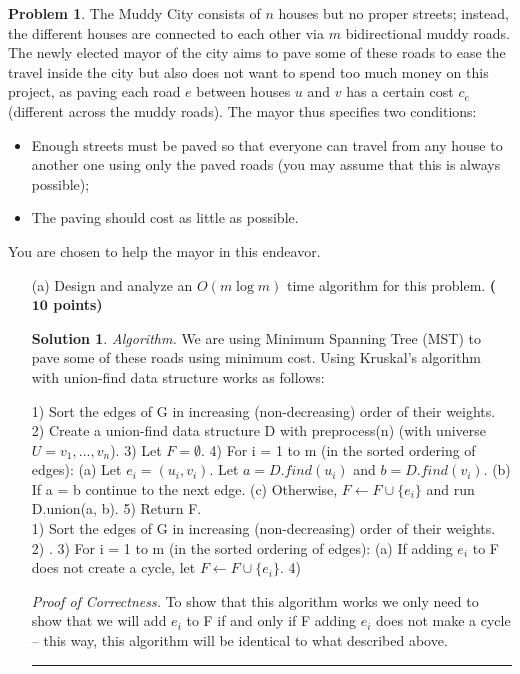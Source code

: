 \documentclass{article}
\theoremstyle{definition}
\newtheorem{problem}{Problem}
\def\fline{\rule{0.75\linewidth}{0.5pt}}
\newcommand{\finishline}{\begin{center}\fline\end{center}}
\newtheorem*{solution*}{Solution}
\newenvironment{solution}{\begin{solution*}}{{\finishline} \end{solution*}}
\newcommand{\grade}[1]{\hfill{\textbf{($\mathbf{#1}$ points)}}}
\begin{document}
\begin{problem}
	The Muddy City consists of $n$ houses but no proper streets; instead, the different houses are connected to each other via $m$ bidirectional muddy roads. The newly elected mayor of the city aims to pave some of these roads to ease
	the travel inside the city but also does not want to spend too much money on this project, as paving each road $e$ between houses $u$ and $v$ has a certain cost $c_e$ (different across the muddy roads). The mayor thus specifies two conditions: 
	\begin{itemize}
		\item Enough streets must be paved so that everyone can travel from any house to another one using only the paved roads (you may assume that this is always possible); 
		\item The paving should cost as little as possible. 
	\end{itemize}
	You are chosen to help the mayor in this endeavor.  
	
	\begin{enumerate}
		\item [(a)] Design and analyze an $O(m\log{m})$ time algorithm for this problem. \grade{10} 
		
		\medskip

\begin{solution}

	\emph{Algorithm.} We are using Minimum Spanning Tree (MST) to pave some of these roads using minimum cost. Using Kruskal’s algorithm with union-find data structure works as follows: 
	
	1) Sort the edges of G in increasing (non-decreasing) order of their weights. 2) Create a union-find data structure D with preprocess(n) (with universe $U = {v_1, . . . , v_n}$). 3) Let $F = \emptyset$. 4) For i = 1 to m (in the sorted ordering of edges): (a) Let $e_i = (u_i, v_i)$. Let $a = D.find(u_i)$ and $b = D.find(v_i)$. (b) If a = b continue to the next edge. (c) Otherwise, $F \gets F \cup \{e_i\}$ and run D.union(a, b). 5) Return F. \\

	
	1) Sort the edges of G in increasing (non-decreasing) order of their weights.
2) . 3) For i = 1 to m (in the sorted ordering of edges): (a) If adding $e_i$ to F does not create a cycle, let $F \gets F \cup \{e_i\}$. 4) 

	\emph{Proof of Correctness.} To show that this algorithm works we only need to show that we will add $e_i$ to F if and only if F adding $e_i$ does not make a cycle – this way, this algorithm will be identical to what described above.
	

\end{solution}
\end{enumerate}
\end{problem}
\end{document}
